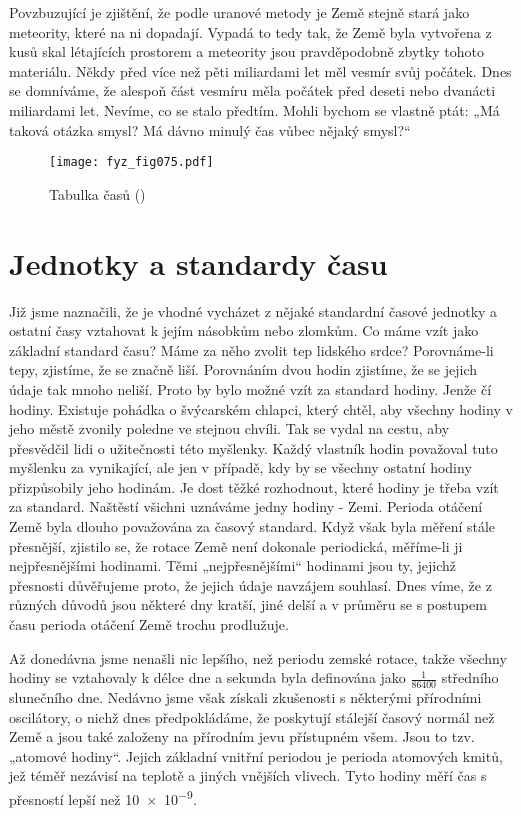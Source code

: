 {    Povzbuzující je zjištění, že podle uranové metody je Země stejně stará jako meteority, které na 
    ni dopadají. Vypadá to tedy tak, že Země byla vytvořena z kusů skal létajících prostorem a 
    meteority jsou pravděpodobně zbytky tohoto materiálu. Někdy před více než pěti miliardami let 
    měl vesmír svůj počátek. Dnes se domníváme, že alespoň část vesmíru měla počátek před deseti 
    nebo dvanácti miliardami let. Nevíme, co se stalo předtím. Mohli bychom se vlastně ptát: „Má 
    taková otázka smysl? Má dávno minulý čas vůbec nějaký smysl?“
    
    \begin{figure}[ht!]  %
      \centering
      \texttt{[image: fyz\_fig075.pdf]}
      \caption{Tabulka časů (\cite[s.~69]{Feynman01})}
      \label{fyz:fig075}
    \end{figure}

  \section{Jednotky a standardy času}
    Již jsme naznačili, že je vhodné vycházet z nějaké standardní časové jednotky a ostatní časy 
    vztahovat k jejím násobkům nebo zlomkům. Co máme vzít jako základní standard času? Máme za něho 
    zvolit tep lidského srdce? Porovnáme-li tepy, zjistíme, že se značně liší. Porovnáním dvou 
    hodin zjistíme, že se jejich údaje tak mnoho neliší. Proto by bylo možné vzít za standard 
    hodiny. Jenže čí hodiny. Existuje pohádka o švýcarském chlapci, který chtěl, aby všechny hodiny 
    v jeho městě zvonily poledne ve stejnou chvíli. Tak se vydal na cestu, aby přesvědčil lidi o 
    užitečnosti této myšlenky. Každý vlastník hodin považoval tuto myšlenku za vynikající, ale jen 
    v případě, kdy by se všechny ostatní hodiny přizpůsobily jeho hodinám. Je dost těžké 
    rozhodnout, které hodiny je třeba vzít za standard. Naštěstí všichni uznáváme jedny hodiny - 
    Zemi. Perioda otáčení Země byla dlouho považována za časový standard. Když však byla měření 
    stále přesnější, zjistilo se, že rotace Země není dokonale periodická, měříme-li ji 
    nejpřesnějšími hodinami. Těmi „nejpřesnějšími“ hodinami jsou ty, jejichž přesnosti důvěřujeme 
    proto, že jejich údaje navzájem souhlasí. Dnes víme, že z různých důvodů jsou některé dny 
    kratší, jiné delší a v průměru se s postupem času perioda otáčení Země trochu prodlužuje.
    
    Až donedávna jsme nenašli nic lepšího, než periodu zemské rotace, takže všechny hodiny se 
    vztahovaly k délce dne a sekunda byla definována jako \(\frac{1}{\num{86400}}\) středního 
    slunečního dne. Nedávno jsme však získali zkušenosti s některými přírodními oscilátory, o nichž 
    dnes předpokládáme, že poskytují stálejší časový normál než Země a jsou také založeny na 
    přírodním jevu přístupném všem. Jsou to tzv. „atomové hodiny“. Jejich základní vnitřní periodou 
    je perioda atomových kmitů, jež téměř nezávisí na teplotě a jiných vnějších vlivech. Tyto 
    hodiny měří čas s přesností lepší než \num{10e-9}.
    
}
